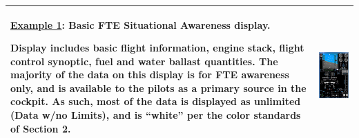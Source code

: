 \documentclass[
]{book}
\begin{document}
\begin{longtable}[]{@{}ll@{}}
\toprule
\endhead
\begin{minipage}[t]{0.46\columnwidth}\raggedright
\underline{Example 1}: Basic FTE
Situational Awareness display.

Display includes basic flight
information, engine stack, flight
control synoptic, fuel and water
ballast quantities.
The majority of the data on this
display is for FTE awareness only, and
is available to the pilots as a
primary source in the cockpit. As
such, most of the data is displayed as
unlimited (Data w/no Limits), and is
``white'' per the color standards of
Section 2.\strut
\end{minipage} & \begin{minipage}[t]{0.48\columnwidth}\raggedright
\includegraphics{media/21/basic-fte-sa.png}\strut
\end{minipage}\tabularnewline
\bottomrule
\end{longtable}
\end{document}
